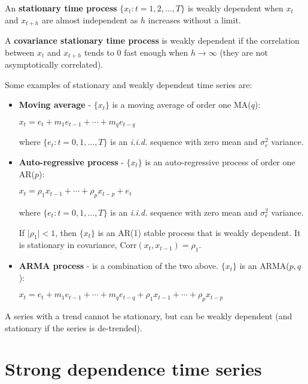 \documentclass[10pt, a4paper, landscape]{extarticle}
\newcommand{\Corr}{\mathrm{Corr}}
\begin{document}
\begin{multicols}{3}
An \textbf{stationary time process} $\lbrace x_t : t = 1, 2, \ldots, T \rbrace$ is weakly dependent when $x_t$ and $x_{t + h}$ are almost independent as $h$ increases without a limit.

A \textbf{covariance stationary time process} is weakly dependent if the correlation between $x_t$ and $x_{t + h}$ tends to $0$ fast enough when $h \rightarrow \infty$ (they are not asymptotically correlated).

Some examples of stationary and weakly dependent time series are:

\begin{itemize}[leftmargin=*]
	\item \textbf{Moving average} - $\lbrace x_t \rbrace$ is a moving average of order one MA($q$):
	\begin{center}
		$x_t = e_t + m_1 e_{t - 1} + \cdots + m_q e_{t - q}$
	\end{center}
	where $\lbrace e_t : t = 0, 1, \ldots, T \rbrace$ is an \textsl{i.i.d.} sequence with zero mean and $\sigma^2_e$ variance.
	\item \textbf{Auto-regressive process} - $\lbrace x_t \rbrace$ is an auto-regressive process of order one AR($p$):
	\begin{center}
		$x_t = \rho_1 x_{t - 1} + \cdots + \rho_p x_{t - p} + e_t$
	\end{center}
	where $\lbrace e_t : t = 0, 1, \ldots, T \rbrace$ is an \textsl{i.i.d.} sequence with zero mean and $\sigma^2_e$ variance.

	If $\lvert \rho_1 \rvert < 1$, then $\lbrace x_t \rbrace$ is an AR(1) stable process that is weakly dependent. It is stationary in covariance, $\Corr(x_t, x_{t - 1}) = \rho_1$.
	\item \textbf{ARMA process} - is a combination of the two above. $\lbrace x_t \rbrace$ is an ARMA($p, q$):
	\begin{center}
		$x_t = e_t + m_1 e_{t - 1} + \cdots + m_q e_{t - q} + \rho_1 x_{t - 1} + \cdots + \rho_p x_{t - p}$
	\end{center}
\end{itemize}

A series with a trend cannot be stationary, but can be weakly dependent (and stationary if the series is de-trended).

\columnbreak

\section*{Strong dependence time series}


\end{multicols}
\end{document}

